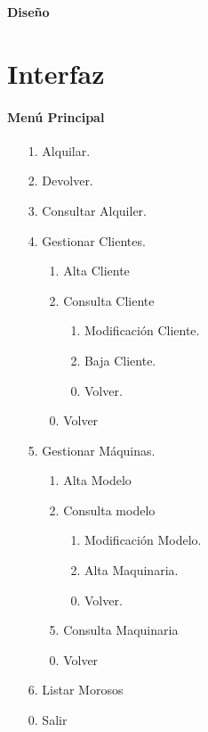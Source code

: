 \newpage{\pagestyle{empty}\cleardoublepage}
\newpage
\vspace*{\fill}
    \begin{center}
      \thispagestyle{empty} \vspace*{0cm} \textbf{\huge
Dise\~{n}o}
    \end{center}
    \vspace*{\fill}
\newpage{\pagestyle{empty}\cleardoublepage}
\chapter{Interfaz}
\subsubsection{Men\'{u} Principal}
\begin{itemize}
	\item[1.] Alquilar.
	\item[2.] Devolver.
	\item[3.] Consultar Alquiler.
	\item[4.] Gestionar Clientes.
	\begin{enumerate}
		\item[1.] Alta Cliente
		\item[2.] Consulta Cliente
		\begin{enumerate}
			\item[1.] Modificaci\'{o}n Cliente.
			\item[2.] Baja Cliente.
			\item[0.] Volver.
		\end{enumerate}
		\item[0.] Volver
	\end{enumerate}
	\item[5.] Gestionar M\'{a}quinas.
	\begin{enumerate}
		\item[1.] Alta Modelo
		\item[2.] Consulta modelo
		\begin{enumerate}
			\item[1.] Modificaci\'{o}n Modelo.
			\item[2.] Alta Maquinaria.
			\item[0.] Volver.
		\end{enumerate}
		\item[5.] Consulta Maquinaria
		\item[0.] Volver
	\end{enumerate}
	\item[6.] Listar Morosos
	\item[0.] Salir
\end{itemize}